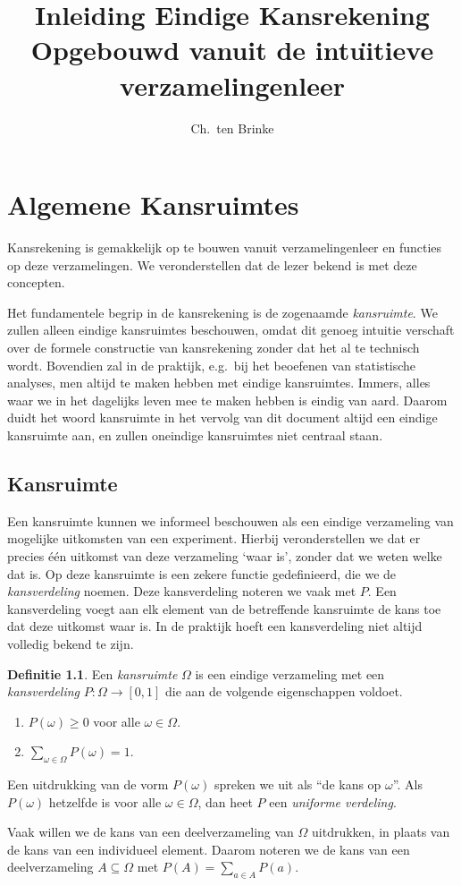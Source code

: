 \documentclass[a4paper]{book}
\title{Inleiding Eindige Kansrekening \\ \small{Opgebouwd vanuit de intu\"{\i}tieve verzamelingenleer}}
\author{Ch.\ ten Brinke}
\theoremstyle{definition}
\newtheorem{definition}[theorem]{Definitie}
\begin{document}
\maketitle

\chapter{Algemene Kansruimtes}
Kansrekening is gemakkelijk op te bouwen vanuit verzamelingenleer en functies op deze verzamelingen.
We veronderstellen dat de lezer bekend is met deze concepten.

Het fundamentele begrip in de kansrekening is de zogenaamde \emph{kansruimte}.
We zullen alleen eindige kansruimtes beschouwen, omdat dit genoeg intuitie verschaft over de formele constructie van kansrekening zonder dat het al te
technisch wordt.
Bovendien zal in de praktijk, e.g.\ bij het beoefenen van statistische analyses, men altijd te maken hebben met eindige kansruimtes.
Immers, alles waar we in het dagelijks leven mee te maken hebben is eindig van aard.
Daarom duidt het woord kansruimte in het vervolg van dit document altijd een eindige kansruimte aan, en zullen oneindige kansruimtes niet centraal
staan.


\section{Kansruimte}
Een kansruimte kunnen we informeel beschouwen als een eindige verzameling van mogelijke uitkomsten van een experiment.
Hierbij veronderstellen we dat er precies \'e\'en uitkomst van deze verzameling `waar is', zonder dat we weten welke dat is.
Op deze kansruimte is een zekere functie gedefinieerd, die we de \emph{kansverdeling} noemen.
Deze kansverdeling noteren we vaak met $P$.
Een kansverdeling voegt aan elk element van de betreffende kansruimte de kans toe dat deze uitkomst waar is.
In de praktijk hoeft een kansverdeling niet altijd volledig bekend te zijn.

\begin{definition}
    Een \emph{kansruimte} $\Omega$ is een eindige verzameling met een \emph{kansverdeling} $P: \Omega \to [0,1]$  die aan de volgende eigenschappen voldoet.
    \begin{enumerate}[i]
        \item $P(\omega) \geq 0$ voor alle $\omega \in \Omega$.
        \item $\sum_{\omega \in \Omega}P(\omega) = 1$.
    \end{enumerate}

    Een uitdrukking van de vorm $P(\omega)$ spreken we uit als ``de kans op $\omega$''.
    Als $P(\omega)$ hetzelfde is voor alle $\omega\in \Omega$, dan heet $P$ een \emph{uniforme verdeling}.

    Vaak willen we de kans van een deelverzameling van $\Omega$ uitdrukken, in plaats van de kans van een individueel element.
    Daarom noteren we de kans van een deelverzameling $A \subseteq \Omega$ met $P(A) = \sum_{a \in A} P(a)$.
\end{definition}
\end{document}
